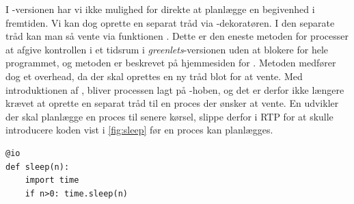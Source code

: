 I -versionen har vi ikke mulighed for direkte at planlægge en begivenhed i fremtiden. Vi kan dog oprette en separat tråd  via -dekoratøren. I den separate tråd kan man så vente via funktionen . Dette er den eneste metoden for processer at afgive kontrollen i et tidsrum i \emph{greenlets}-versionen uden at blokere for hele programmet, og metoden er beskrevet på  hjemmesiden for \pycsp. Metoden medfører dog et overhead, da der skal oprettes en ny tråd blot for at vente.  Med introduktionen af , bliver processen lagt på -hoben, og det er derfor ikke længere krævet at oprette en separat tråd til en proces der ønsker at vente. En udvikler der skal planlægge en proces til senere kørsel, slippe derfor i RTP for at skulle introducere koden vist i \cref{fig:sleep} før en proces kan planlægges.

\begin{lstlisting}[firstnumber=1 ,float=hbtp, label=fig:sleep, caption=Funktion der venter et antal sekunder]
@io
def sleep(n):
    import time
    if n>0: time.sleep(n)
\end{lstlisting}
 
